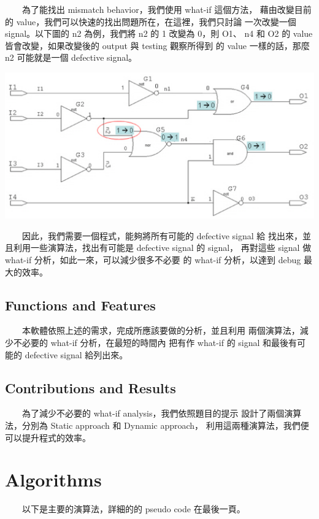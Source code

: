 \documentclass[12pt,a4paper]{article}
\begin{document}
\begin{CJK*}{UTF8}{song}
　　為了能找出 mismatch behavior，我們使用 what-if 這個方法，%
藉由改變目前的 value，我們可以快速的找出問題所在，在這裡，我們只討論%
一次改變一個 signal。以下圖的 n2 為例，我們將 n2 的 1 改變為 0，則 O1、%
n4 和 O2 的 value 皆會改變，如果改變後的 output 與 testing 觀察所得到%
的 value 一樣的話，那麼 n2 可能就是一個 defective signal。

\begin{center}
\includegraphics[scale=0.6]{imgs/02.eps}
\end{center}

　　因此，我們需要一個程式，能夠將所有可能的 defective signal 給%
找出來，並且利用一些演算法，找出有可能是 defective signal 的 signal，%
再對這些 signal 做 what-if 分析，如此一來，可以減少很多不必要%
的 what-if 分析，以達到 debug 最大的效率。

\subsection{Functions and Features}

　　本軟體依照上述的需求，完成所應該要做的分析，並且利用%
兩個演算法，減少不必要的 what-if 分析，在最短的時間內%
把有作 what-if 的 signal 和最後有可能的 defective signal 給列出來。%

\subsection{Contributions and Results}

　　為了減少不必要的 what-if analysis，我們依照題目的提示%
設計了兩個演算法，分別為 Static approach 和 Dynamic approach，%
利用這兩種演算法，我們便可以提升程式的效率。

\section{Algorithms}

　　以下是主要的演算法，詳細的的 pseudo code 在最後一頁。


\end{CJK*}
\end{document}
